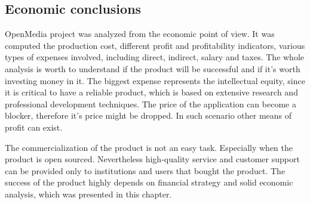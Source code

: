 \subsection{Economic conclusions}
OpenMedia project was analyzed from the economic point of view. It was computed the production cost, different profit and profitability indicators, various types of expenses involved, including direct, indirect, salary and taxes. The whole analysis is worth to understand if the product will be successful and if it's worth investing money in it. The biggest expense represents the intellectual equity, since it is critical to have a reliable product, which is based on extensive research and professional development techniques. The price of the application can become a blocker, therefore it's price might be dropped. In such scenario other means of profit can exist.

The commercialization of the product is not an easy task. Especially when the product is open sourced. Nevertheless high-quality service and customer support can be provided only to institutions and users that bought the product. The success of the product highly depends on financial strategy and solid economic analysis, which was presented in this chapter.
\clearpage